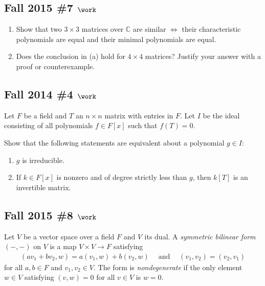 \hypertarget{fall-2015-7-work}{%
\subsection{\texorpdfstring{Fall 2015 \#7
\(\work\)}{Fall 2015 \#7 \textbackslash work}}\label{fall-2015-7-work}}

\begin{enumerate}
\def\labelenumi{\alph{enumi}.}
\item
  Show that two \(3\times 3\) matrices over \({\mathbb{C}}\) are similar
  \(\iff\) their characteristic polynomials are equal and their minimal
  polynomials are equal.
\item
  Does the conclusion in (a) hold for \(4\times 4\) matrices? Justify
  your answer with a proof or counterexample.
\end{enumerate}

\hypertarget{fall-2014-4-work}{%
\subsection{\texorpdfstring{Fall 2014 \#4
\(\work\)}{Fall 2014 \#4 \textbackslash work}}\label{fall-2014-4-work}}

Let \(F\) be a field and \(T\) an \(n\times n\) matrix with entries in
\(F\). Let \(I\) be the ideal consisting of all polynomials
\(f\in F[x]\) such that \(f(T) =0\).

Show that the following statements are equivalent about a polynomial
\(g\in I\):

\begin{enumerate}
\def\labelenumi{\alph{enumi}.}
\item
  \(g\) is irreducible.
\item
  If \(k\in F[x]\) is nonzero and of degree strictly less than \(g\),
  then \(k[T]\) is an invertible matrix.
\end{enumerate}

\hypertarget{fall-2015-8-work}{%
\subsection{\texorpdfstring{Fall 2015 \#8
\(\work\)}{Fall 2015 \#8 \textbackslash work}}\label{fall-2015-8-work}}

Let \(V\) be a vector space over a field \(F\) and \(V {}^{ \check{} }\)
its dual. A \emph{symmetric bilinear form} \(({-}, {-})\) on \(V\) is a
map \(V\times V\to F\) satisfying
\begin{align*}
(av_1 + b v_2, w) = a(v_1, w) + b(v_2, w) {\quad \operatorname{and} \quad} (v_1, v_2) = (v_2, v_1)
\end{align*}
for all \(a, b\in F\) and \(v_1, v_2 \in V\). The form is
\emph{nondegenerate} if the only element \(w\in V\) satisfying
\((v, w) = 0\) for all \(v\in V\) is \(w=0\).

